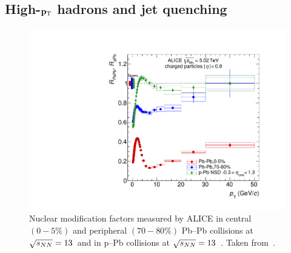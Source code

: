 \subsection{High-$\mathbf{p\mathrm{_T}}$ hadrons and jet quenching}\label{sec:high_pt}
\begin{figure}[htb]
  \centering
  \includegraphics[width=0.7\linewidth]{Figures/Chapter 1/rAArpPb.pdf}
  \caption{Nuclear modification factors measured by ALICE in central $(0-5\%)$ and peripheral $(70-80\%)$ Pb--Pb collisions at $\sqrt{s_{NN}}=13$~\tev and in p--Pb collisions at $\sqrt{s_{NN}} = 13$~\tev. Taken from~\cite{ALICE:2018vuu}.}
  \label{fig:RAA}
\end{figure}

